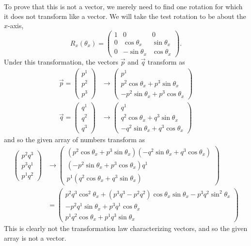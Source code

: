 \documentclass[../group-theory-in-a-nutshell-for-physicists.tex]{subfiles}
\begin{document}
\begin{questions}
\begin{solution}
	To prove that this is not a vector, we merely need to find one rotation for which it does not transform like a vector. We will take the test rotation to be about the $x$-axis,
	\[
		R_x(\theta_x) = \begin{pmatrix}
		1 & 0 & 0 \\
		0 & \cos\theta_x & \sin\theta_x \\
		0 & -\sin\theta_x & \cos\theta_x
		\end{pmatrix}.
	\]
	Under this transformation, the vectors $\overrightarrow{p}$ and $\overrightarrow{q}$ transform as
	\begin{align*}
		\overrightarrow{p} = \begin{pmatrix}p^1 \\ p^2 \\ p^3\end{pmatrix} &\to \begin{pmatrix}
			p^1 \\
			p^2\cos\theta_x + p^3\sin\theta_x \\
			-p^2\sin\theta_x + p^3\cos\theta_x
		\end{pmatrix} \\
		\overrightarrow{q} = \begin{pmatrix}q^1 \\ q^2 \\ q^3\end{pmatrix} &\to \begin{pmatrix}
			q^1 \\
			q^2\cos\theta_x + q^3\sin\theta_x \\
			-q^2\sin\theta_x + q^3\cos\theta_x
		\end{pmatrix}
	\end{align*}
	and so the given array of numbers transform as
	\begin{align*}
		\begin{pmatrix}
			p^{2}q^{3} \\
			p^{3}q^{1} \\
			p^{1}q^{2}
		\end{pmatrix} &\to \begin{pmatrix}
		(p^2\cos\theta_x + p^3\sin\theta_x)(-q^2\sin\theta_x + q^3\cos\theta_x) \\
		(-p^2\sin\theta_x + p^3\cos\theta_x)q^{1} \\
		p^{1}(q^2\cos\theta_x + q^3\sin\theta_x)
	\end{pmatrix} \\
	&= \begin{pmatrix}
		p^2q^3\cos^2\theta_x + (p^3q^3 - p^2q^2)\cos\theta_x\sin\theta_x - p^3q^2\sin^2\theta_x \\
		-p^2q^{1}\sin\theta_x + p^3q^{1}\cos\theta_x \\
		p^{1}q^2\cos\theta_x + p^{1}q^3\sin\theta_x
	\end{pmatrix}
	\end{align*}
	This is clearly not the transformation law characterizing vectors, and so the given array is not a vector.
	

\end{solution}
\end{questions}
\end{document}
